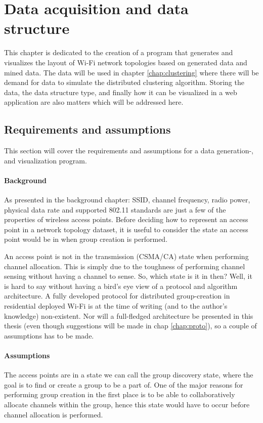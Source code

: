 \chapter{Data acquisition and data structure}\label{dataacc}
This chapter is dedicated to the creation of a program that generates and visualizes the layout of Wi-Fi network topologies based on generated data and mined data.
The data will be used in chapter \ref{chap:clustering} where there will be demand for data to simulate the distributed clustering algorithm. Storing the data,
the data structure type, and finally how it can be visualized in a web application are also matters which will be addressed here. 


\section{Requirements and assumptions}
This section will cover the requirements and assumptions for a data generation-, and visualization program. 

\subsubsection{Background}
As presented in the background chapter: SSID, channel frequency, radio power, physical data rate and supported 802.11 standards are just a few of the properties
of wireless access points. Before deciding how to represent an access point in a network topology dataset, it is useful to
consider the state an access point would be in when group creation is performed.  

An access point is not in the transmission (CSMA/CA) state when performing channel allocation. This is simply due to the toughness of performing channel sensing without
having a channel to sense. So, which state is it in then? Well, it is hard to say without having a bird's eye view of a protocol and algorithm architecture. A fully developed protocol
for distributed group-creation in residential deployed Wi-Fi is at the time of writing (and to the author's knowledge) non-existent. Nor will a full-fledged architecture be presented in
this thesis (even though suggestions will be made in chap \ref{chap:proto}), so a couple of assumptions has to be made. 

\subsubsection{Assumptions}
The access points are in a state we can call the group discovery state, where the goal is to find or create a group to be a part of.
One of the major reasons for performing group creation in the first place is to be able to collaboratively allocate channels within the group, hence this state would
have to occur before channel allocation is performed. 

